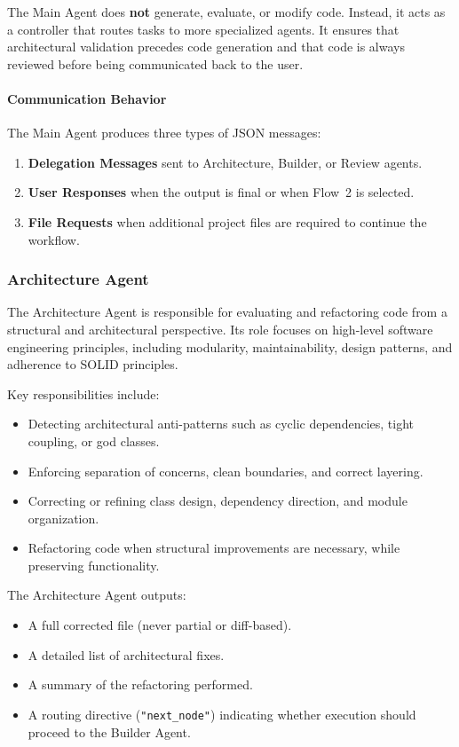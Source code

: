\documentclass[12pt,a4paper]{article}
\begin{document}
The Main Agent does \textbf{not} generate, evaluate, or modify code. Instead, it acts as a controller that routes tasks to more specialized agents. It ensures that architectural validation precedes code generation and that code is always reviewed before being communicated back to the user.

\paragraph{Communication Behavior}
The Main Agent produces three types of JSON messages:

\begin{enumerate}
    \item \textbf{Delegation Messages} sent to Architecture, Builder, or Review agents.
    \item \textbf{User Responses} when the output is final or when Flow~2 is selected.
    \item \textbf{File Requests} when additional project files are required to continue the workflow.
\end{enumerate}

\subsubsection{Architecture Agent}

The Architecture Agent is responsible for evaluating and refactoring code from a structural and architectural perspective. Its role focuses on high-level software engineering principles, including modularity, maintainability, design patterns, and adherence to SOLID principles.

Key responsibilities include:

\begin{itemize}
    \item Detecting architectural anti-patterns such as cyclic dependencies, tight coupling, or god classes.
    \item Enforcing separation of concerns, clean boundaries, and correct layering.
    \item Correcting or refining class design, dependency direction, and module organization.
    \item Refactoring code when structural improvements are necessary, while preserving functionality.
\end{itemize}

The Architecture Agent outputs:

\begin{itemize}
    \item A full corrected file (never partial or diff-based).
    \item A detailed list of architectural fixes.
    \item A summary of the refactoring performed.
    \item A routing directive (\texttt{"next\_node"}) indicating whether execution should proceed to the Builder Agent.
\end{itemize}
\end{document}
